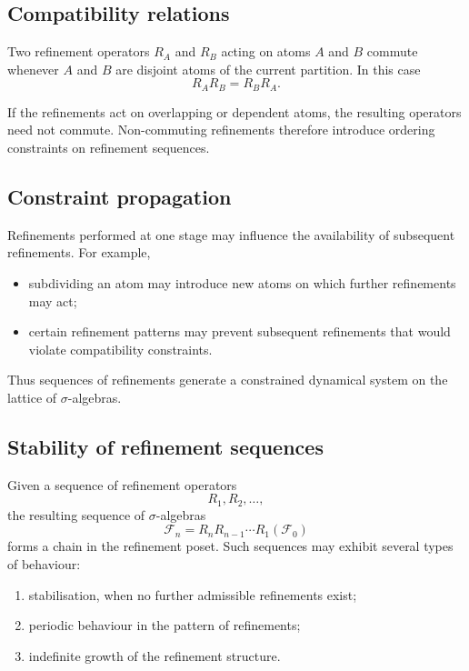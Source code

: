 \documentclass[
 amsmath,amssymb,
  onecolumn %
]{revtex4-2}
\begin{document}
\subsection{Compatibility relations}

Two refinement operators $R_A$ and $R_B$ acting on atoms
$A$ and $B$ commute whenever $A$ and $B$ are disjoint atoms
of the current partition. In this case
\[
R_A R_B = R_B R_A .
\]

If the refinements act on overlapping or dependent atoms,
the resulting operators need not commute. Non-commuting
refinements therefore introduce ordering constraints on
refinement sequences.





\subsection{Constraint propagation}

Refinements performed at one stage may influence the
availability of subsequent refinements. For example,

\begin{itemize}
\item subdividing an atom may introduce new atoms on which
further refinements may act;

\item certain refinement patterns may prevent subsequent
refinements that would violate compatibility constraints.
\end{itemize}

Thus sequences of refinements generate a constrained
dynamical system on the lattice of $\sigma$-algebras.

\subsection{Stability of refinement sequences}

Given a sequence of refinement operators
\[
R_1,R_2,\dots ,
\]
the resulting sequence of $\sigma$-algebras
\[
\mathcal F_n = R_n R_{n-1}\cdots R_1(\mathcal F_0)
\]
forms a chain in the refinement poset.
Such sequences may exhibit several types of behaviour:

\begin{enumerate}
\item stabilisation, when no further admissible refinements exist;
\item periodic behaviour in the pattern of refinements;
\item indefinite growth of the refinement structure.
\end{enumerate}
\end{document}
